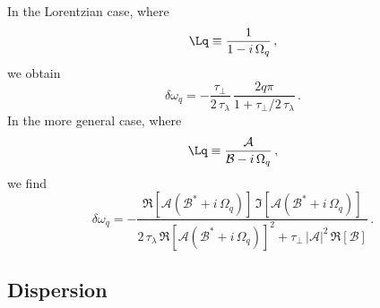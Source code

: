 In the Lorentzian case, where
\begin{equation} \label{eqn:mml_lmc_q_def}
    \Lq \equiv \frac{1}{1 - i\, \Omega_q}\, ,
\end{equation}
we obtain
\begin{equation}\label{eqn:mml_1d_freq_pull}
    \delta \omega_q = -\frac{\tau_\perp}{2\, \tau_\lambda}\, \frac{2 q \pi}{1 + \tau_\perp/2\, \tau_\lambda}\, .
\end{equation}
In the more general case, where
\begin{equation}
    \Lq \equiv \frac{\mathcal{A}}{\mathcal{B} - i\, \Omega_q}\, ,
\end{equation}
we find
\begin{equation}\label{eqn:mml_1d_freq_pull_general}
    \delta \omega_q = -\frac{\Re\left[\mathcal{A}\left(\mathcal{B}^\ast + i\, \Omega_q\right)\right]\, \Im\left[\mathcal{A}\left(\mathcal{B}^\ast + i\, \Omega_q\right)\right]}{2\, \tau_\lambda\, \Re\left[\mathcal{A}\left(\mathcal{B}^\ast + i\, \Omega_q\right)\right]^2 + \tau_\perp\, \left|\mathcal{A}\right|^2\, \Re\left[\mathcal{B}\right]}\, .
\end{equation}

 \subsection{Dispersion\label{sct:laser_dynamics_1d_mml_frq_dis}}

